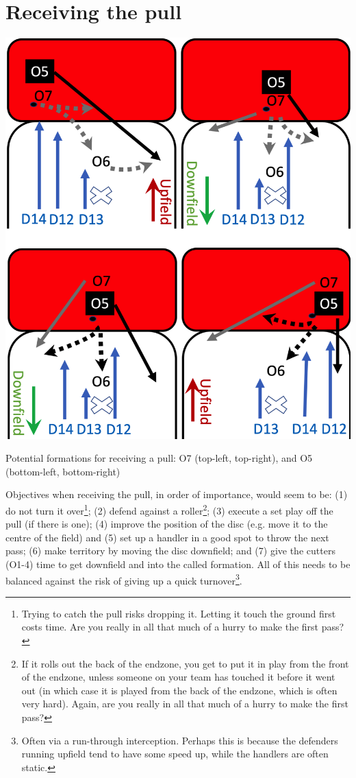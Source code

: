 \documentclass{tufte-handout}
\begin{document}
\section{Receiving the pull} 
\label{sec:vertical}
\begin{marginfigure}%
  \includegraphics[width=\linewidth]{O5-pull}
  \caption{Potential formations for receiving a pull: 
  O7 (top-left, top-right), and O5 (bottom-left, bottom-right)}
  \label{fig:O5-pull}
\end{marginfigure}
Objectives 
when receiving the pull,
in order of importance, 
would seem to be:
(1) do not turn it over\footnote{
Trying to catch the pull 
risks dropping it.  
Letting it 
touch the ground first 
costs time. 
Are you really in all 
that much of a hurry 
to make the first pass?};
(2) defend against a roller\footnote{
If it rolls out the 
back of the endzone, 
you get to put it in play 
from the front of the endzone, 
unless someone on your team 
has touched it before it went out 
(in which case 
it is played from 
the back of the endzone, 
which is often very hard).
Again, are you really in all 
that much of a hurry 
to make the first pass?}; 
(3) execute a set play off the pull 
(if there is one); 
(4) improve the position of the disc 
(e.g. move it to the centre of the field) 
and (5) set up a handler in a good spot 
to throw the next pass; 
(6) make territory by moving the disc downfield; and 
(7) give the cutters (O1-4) time to get downfield 
and into the called formation. 
All of this 
needs to be 
balanced against 
the risk of giving up 
a quick turnover\footnote{Often via 
a run-through 
interception.  
Perhaps this is because 
the defenders running upfield
tend to have some speed up, 
while the handlers are often 
static.}.
\end{document}
